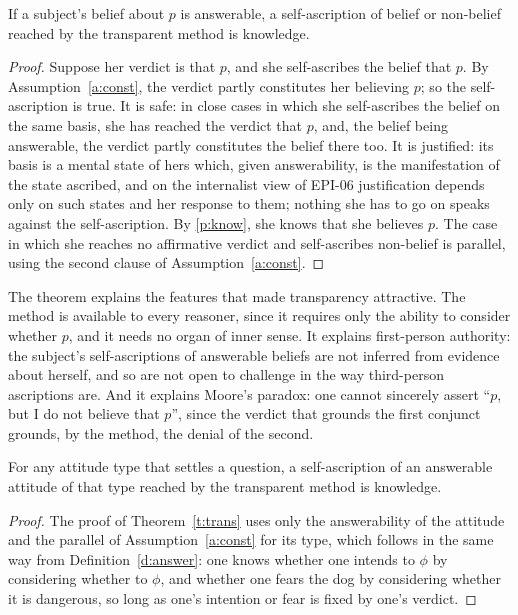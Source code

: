 \documentclass{situationist-preprint}
\begin{document}
\begin{theorem}[Transparency]\label{t:trans}
If a subject's belief about $p$ is answerable, a self-ascription of belief or non-belief reached by the transparent method is knowledge.
\end{theorem}

\begin{proof}
Suppose her verdict is that $p$, and she self-ascribes the belief that $p$. By Assumption~\ref{a:const}, the verdict partly constitutes her believing $p$; so the self-ascription is true. It is safe: in close cases in which she self-ascribes the belief on the same basis, she has reached the verdict that $p$, and, the belief being answerable, the verdict partly constitutes the belief there too. It is justified: its basis is a mental state of hers which, given answerability, is the manifestation of the state ascribed, and on the internalist view of EPI-06 justification depends only on such states and her response to them; nothing she has to go on speaks against the self-ascription. By \ref{p:know}, she knows that she believes $p$. The case in which she reaches no affirmative verdict and self-ascribes non-belief is parallel, using the second clause of Assumption~\ref{a:const}.
\end{proof}

The theorem explains the features that made transparency attractive. The method is available to every reasoner, since it requires only the ability to consider whether $p$, and it needs no organ of inner sense. It explains first-person authority: the subject's self-ascriptions of answerable beliefs are not inferred from evidence about herself, and so are not open to challenge in the way third-person ascriptions are. And it explains Moore's paradox: one cannot sincerely assert \enquote{$p$, but I do not believe that $p$}, since the verdict that grounds the first conjunct grounds, by the method, the denial of the second.

\begin{corollary}[Extension]\label{c:ext}
For any attitude type that settles a question, a self-ascription of an answerable attitude of that type reached by the transparent method is knowledge.
\end{corollary}

\begin{proof}
The proof of Theorem~\ref{t:trans} uses only the answerability of the attitude and the parallel of Assumption~\ref{a:const} for its type, which follows in the same way from Definition~\ref{d:answer}: one knows whether one intends to $\phi$ by considering whether to $\phi$, and whether one fears the dog by considering whether it is dangerous, so long as one's intention or fear is fixed by one's verdict.
\end{proof}
\end{document}
